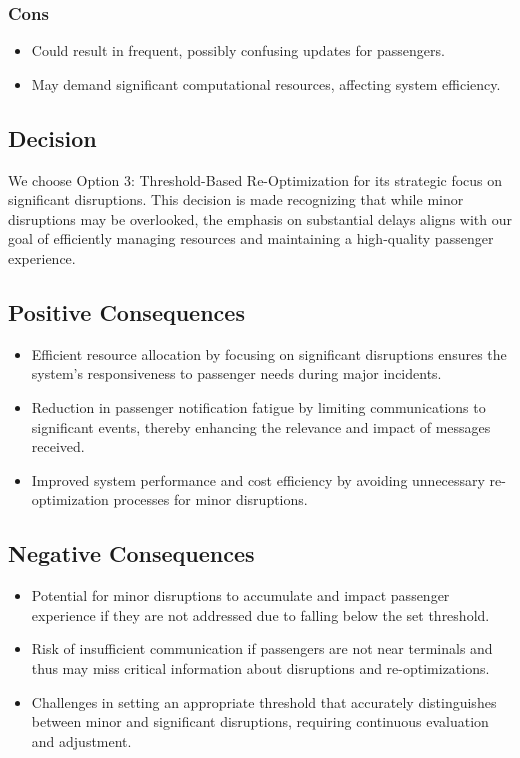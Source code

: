 \subsubsection*{Cons}
\begin{itemize}
    \item Could result in frequent, possibly confusing updates for passengers.
    \item May demand significant computational resources, affecting system efficiency.
\end{itemize}


\subsection*{Decision}
We choose Option 3: Threshold-Based Re-Optimization for its strategic focus on significant disruptions. This decision is made recognizing that while minor disruptions may be overlooked, the emphasis on substantial delays aligns with our goal of efficiently managing resources and maintaining a high-quality passenger experience.

\subsection*{Positive Consequences}
\begin{itemize}
    \item Efficient resource allocation by focusing on significant disruptions ensures the system's responsiveness to passenger needs during major incidents.
    \item Reduction in passenger notification fatigue by limiting communications to significant events, thereby enhancing the relevance and impact of messages received.
    \item Improved system performance and cost efficiency by avoiding unnecessary re-optimization processes for minor disruptions.
\end{itemize}

\subsection*{Negative Consequences}
\begin{itemize}
    \item Potential for minor disruptions to accumulate and impact passenger experience if they are not addressed due to falling below the set threshold.
    \item Risk of insufficient communication if passengers are not near terminals and thus may miss critical information about disruptions and re-optimizations.
    \item Challenges in setting an appropriate threshold that accurately distinguishes between minor and significant disruptions, requiring continuous evaluation and adjustment.
\end{itemize}
